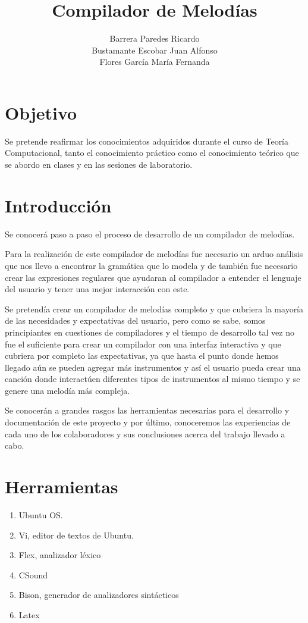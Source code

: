 \documentclass[12pt]{article}
\title{\textbf{Compilador de Melodías}}
\author{Barrera Paredes Ricardo\\
Bustamante Escobar Juan Alfonso\\
Flores García María Fernanda\\
  	}
\date{}
\begin{document}
\maketitle

\section{Objetivo}

Se pretende reafirmar los conocimientos adquiridos durante el curso de Teoría Computacional, tanto el conocimiento práctico como el conocimiento teórico que se abordo en clases y en las sesiones de laboratorio.

\section{Introducción}

Se conocerá paso a paso el proceso de desarrollo de un compilador de melodías. 

Para la realización de este compilador de melodías fue necesario un arduo análisis que nos llevo a encontrar la gramática que lo modela y de también fue necesario crear las expresiones regulares que ayudaran al compilador a entender el lenguaje del usuario y tener una mejor interacción con este. 

Se pretendía crear un compilador de melodías completo y que cubriera la mayoría de las necesidades y expectativas del usuario, pero como se sabe, somos principiantes en cuestiones de compiladores y el tiempo de desarrollo tal vez no fue el suficiente para crear un compilador con una interfaz interactiva y que cubriera por completo  las expectativas, ya que hasta el punto donde hemos llegado aún se pueden agregar más instrumentos y así el usuario pueda crear una canción donde interactúen diferentes tipos de instrumentos al mismo tiempo y se genere una melodía más compleja.

Se conocerán a grandes rasgos las herramientas necesarias para el desarrollo y documentación de este proyecto y por último, conoceremos las experiencias de cada uno de los colaboradores y sus conclusiones acerca del trabajo llevado a cabo.

\section{Herramientas}

\begin{enumerate}

\item Ubuntu OS.\\
\item Vi, editor de textos de Ubuntu.\\
\item Flex, analizador léxico\\
\item CSound\\
\item Bison, generador de analizadores sintácticos\\
\item Latex\\

\end{enumerate}
\end{document}
